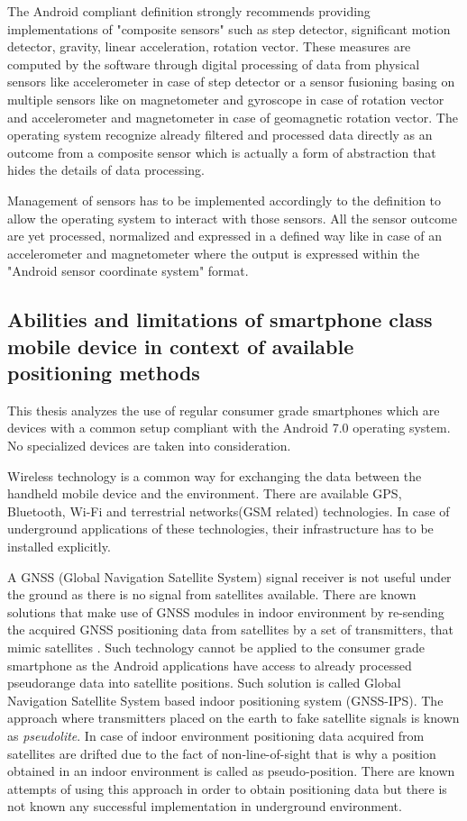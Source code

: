 \documentclass[../main.tex]{subfiles}
\begin{document}
The Android compliant definition strongly recommends providing implementations of "composite sensors" such as step detector, significant motion detector, gravity, linear acceleration, rotation vector. These measures are computed by the software through digital processing of data from physical sensors like accelerometer in case of step detector or a sensor fusioning basing on multiple sensors like on magnetometer and gyroscope in case of rotation vector and accelerometer and magnetometer in case of geomagnetic rotation vector. The operating system recognize already filtered and processed data directly as an outcome from a composite sensor which is actually a form of abstraction that hides the details of data processing.

Management of sensors has to be implemented accordingly to the definition to allow the operating system to interact with those sensors. All the sensor outcome are yet processed, normalized and expressed in a defined way like in case of an accelerometer and magnetometer where the output is expressed within the "Android sensor coordinate system" format.


\subsection{Abilities and limitations of smartphone class mobile device in context of available positioning methods}
\label{subs:smartphone_abilities_and_limitations}

This thesis analyzes the use of regular consumer grade smartphones which are devices with a common setup compliant with the Android 7.0 operating system. No specialized devices are taken into consideration.

Wireless technology is a common way for exchanging the data between the handheld mobile device and the environment. There are available GPS, Bluetooth, Wi-Fi and terrestrial networks(GSM related) technologies. In case of underground applications of these technologies, their infrastructure has to be installed explicitly.

A GNSS (Global Navigation Satellite System) signal receiver is not useful under the ground as there is no signal from satellites available. There are known solutions that make use of GNSS modules in indoor environment by re-sending the acquired GNSS positioning data from satellites by a set of transmitters, that mimic satellites \cite{GPS_retransmission}. Such technology cannot be applied to the consumer grade smartphone as the Android applications have access to already processed pseudorange data into satellite positions. Such solution is called Global Navigation Satellite System based indoor positioning system (GNSS-IPS)\cite{GPS_retransmission_differential}. The approach where transmitters placed on the earth to fake satellite signals is known as \textit{pseudolite}. In case of indoor environment positioning data acquired from satellites are drifted due to the fact of non-line-of-sight that is why a position obtained in an indoor environment is called as pseudo-position. There are known attempts of using this approach in order to obtain positioning data but there is not known any successful implementation in underground environment.
\end{document}
